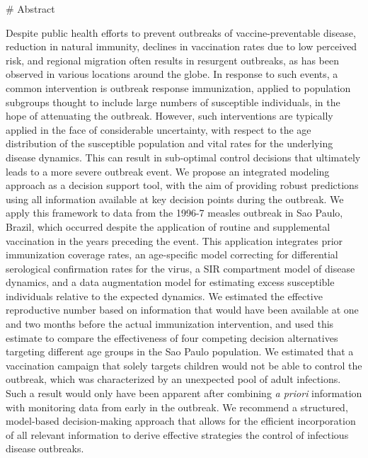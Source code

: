 # Abstract

Despite public health efforts to prevent outbreaks of vaccine-preventable disease, reduction in natural immunity, declines in vaccination rates due to low perceived risk, and regional migration  often results in resurgent outbreaks, as has been observed in various locations around the globe. In response to such events, a common intervention is outbreak response immunization, applied to population subgroups thought to include large numbers of susceptible individuals, in the hope of attenuating the outbreak. However, such interventions are typically applied in the face of considerable uncertainty, with respect to the age distribution of the susceptible population and vital rates for the underlying disease dynamics. This can result in sub-optimal control decisions that ultimately leads to a more severe outbreak event. We propose an integrated modeling approach as a decision support tool, with the aim of providing robust predictions using all information available at key decision points during the outbreak. We apply this framework to data from the 1996-7 measles outbreak in Sao Paulo, Brazil, which occurred despite the application of routine and supplemental vaccination in the years preceding the event. This application integrates prior immunization coverage rates, an age-specific model correcting for differential serological confirmation rates for the virus, a SIR compartment model of disease dynamics, and a data augmentation model for estimating excess susceptible individuals relative to the expected dynamics. We estimated the effective reproductive number based on information that would have been available at one and two months before the actual immunization intervention, and used this estimate to compare the effectiveness of four competing decision alternatives targeting different age groups in the Sao Paulo population. We estimated that a vaccination campaign that solely targets children would not be able to control the outbreak, which was characterized by an unexpected pool of adult infections. Such a result would only have been apparent after combining \textit{a priori} information with monitoring data from early in the outbreak. We recommend a structured, model-based decision-making approach that allows for the efficient incorporation of all relevant information to derive effective strategies the control of infectious disease outbreaks.